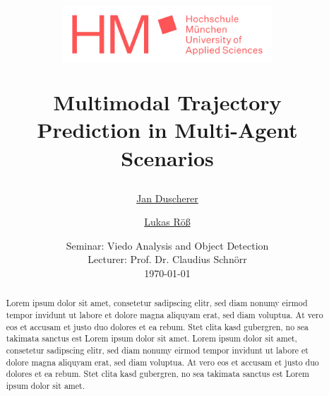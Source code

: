 \documentclass[a4paper]{article}
\begin{document}
	\title{
	\begin{figure}[!ht]
		\flushleft
			\includegraphics[width=0.7\textwidth]{hochschule-muenchen-logo.png}
	\end{figure}
	\vspace{1cm}
	\Huge Multimodal Trajectory \\ Prediction in Multi-Agent Scenarios \\
	}
	
	\vspace{1cm}
	
	
	\author{\Large \href{mailto:jan.duscherer@hm.edu}{Jan Duscherer} \and \Large \href{mailto:lukas.roess@hm.edu}{Lukas Röß}
	\vspace{1cm}}
	
	\date{
	\large Seminar: Viedo Analysis and Object Detection \\ 
	\vspace{0.8cm}
	\large Lecturer: Prof. Dr. Claudius Schnörr \\
	\vspace{1cm}
	\today
	}

	\maketitle
	\setlength{\parindent}{0pt}

\vspace{2cm}
\begin{abstract}
Lorem ipsum dolor sit amet, consetetur sadipscing elitr, sed diam nonumy eirmod tempor invidunt ut labore et dolore magna aliquyam erat, sed diam voluptua. At vero eos et accusam et justo duo dolores et ea rebum. Stet clita kasd gubergren, no sea takimata sanctus est Lorem ipsum dolor sit amet. Lorem ipsum dolor sit amet, consetetur sadipscing elitr, sed diam nonumy eirmod tempor invidunt ut labore et dolore magna aliquyam erat, sed diam voluptua. At vero eos et accusam et justo duo dolores et ea rebum. Stet clita kasd gubergren, no sea takimata sanctus est Lorem ipsum dolor sit amet.

\end{abstract}
	\newpage
	\tableofcontents
	\newpage
	
\end{document}
